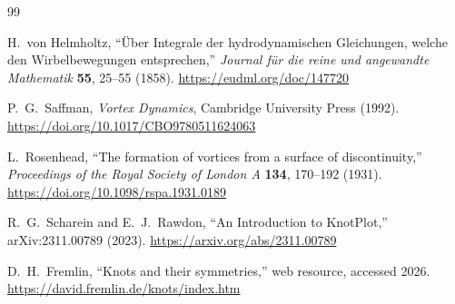 \begin{thebibliography}{99}

H.~von Helmholtz,
``Über Integrale der hydrodynamischen Gleichungen, welche den Wirbelbewegungen entsprechen,''
\emph{Journal für die reine und angewandte Mathematik} \textbf{55}, 25--55 (1858).
\url{https://eudml.org/doc/147720}

P.~G.~Saffman,
\emph{Vortex Dynamics},
Cambridge University Press (1992).
\url{https://doi.org/10.1017/CBO9780511624063}

L.~Rosenhead,
``The formation of vortices from a surface of discontinuity,''
\emph{Proceedings of the Royal Society of London A} \textbf{134}, 170--192 (1931).
\url{https://doi.org/10.1098/rspa.1931.0189}

R.~G.~Scharein and E.~J.~Rawdon,
``An Introduction to KnotPlot,''
arXiv:2311.00789 (2023).
\url{https://arxiv.org/abs/2311.00789}

D.~H.~Fremlin,
``Knots and their symmetries,''
web resource, accessed 2026.
\url{https://david.fremlin.de/knots/index.htm}

\end{thebibliography}
